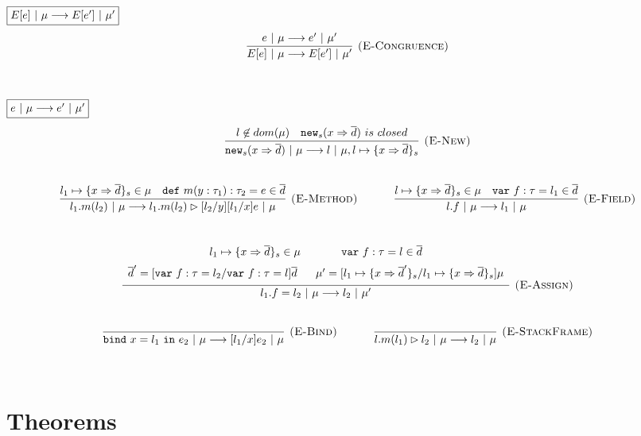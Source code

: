 \documentclass{llncs}
\newcommand{\keywadj}[1]{\mathtt{#1}}
\newcommand{\keyw}[1]{\keywadj{#1}~}
\begin{document}
$\fbox{$E[e]~|~\mu \longrightarrow E[e']~|~\mu'$}$
\[
\begin{array}{c}
\infer[\textsc{(E-Congruence)}]
  {E[e]~|~\mu \longrightarrow E[e']~|~\mu'}
  {e~|~\mu \longrightarrow e'~|~\mu'}\\[5ex]  
\end{array}
\]


$\fbox{$e~|~\mu \longrightarrow e'~|~\mu'$}$
\[
\begin{array}{c}
\infer[\textsc{(E-New)}]
  {\keywadj{new}_{s}(x \Rightarrow \overline{d})~|~\mu \longrightarrow l~|~\mu, l \mapsto \{ x \Rightarrow \overline{d} \}_{s}}
  {l \not\in dom(\mu) & \keywadj{new}_{s}(x \Rightarrow \overline{d})~is~closed}\\[5ex]

\infer[\textsc{(E-Method)}]
  {l_1.m(l_2)~|~\mu \longrightarrow l_1.m(l_2) \rhd [l_2/y][l_1/x]e~|~\mu}
  {l_1 \mapsto \{ x \Rightarrow \overline{d} \}_{s} \in \mu & \keyw{def} m(y : \tau_1) : \tau_2 = e \in \overline{d}}%
~~~~~~~~~~
\infer[\textsc{(E-Field)}]
  {l.f~|~\mu \longrightarrow l_1~|~\mu}
  {l \mapsto \{ x \Rightarrow \overline{d} \}_{s} \in \mu & \keyw{var} f:\tau = l_1 \in \overline{d}}\\[5ex]

\infer[\textsc{(E-Assign)}]
  {l_1.f = l_2~|~\mu \longrightarrow l_2~|~\mu'}
  {\def\arraystretch{1.6}
  \begin{array}{c}
l_1 \mapsto \{ x \Rightarrow \overline{d} \}_{s} \in \mu~~~~~~~~~~~\keyw{var} f:\tau = l \in \overline{d} \\
\overline{d}' = [\keyw{var} f:\tau = l_2/\keyw{var} f:\tau = l]\overline{d}~~~~~\mu' = [l_1 \mapsto \{ x \Rightarrow \overline{d}' \}_{s}/l_1 \mapsto \{ x \Rightarrow \overline{d} \}_{s}]\mu
  \end{array}}\\[5ex]

\infer[\textsc{(E-Bind)}]
  {\keyw{bind} x = l_1~\keyw{in} e_2~|~\mu \longrightarrow [l_1/x]e_2~|~\mu}
  {}%
~~~~~~~~~~
\infer[\textsc{(E-StackFrame)}]
  {l.m(l_1) \rhd l_2~|~\mu \longrightarrow l_2~|~\mu}
  {}\\[5ex]
  
\end{array}
\]

\newpage

\section{Theorems}
\end{document}
